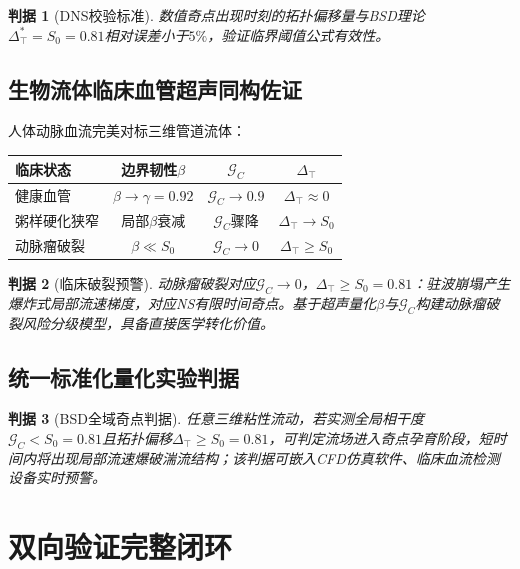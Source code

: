 \documentclass[11pt,a4paper]{ctexart}
\newtheorem{criterion}{判据}
\theoremstyle{remark}
\newcommand{\Szero}{S_{0}}
\newcommand{\GC}{\mathcal{G}_{\!C}}
\newcommand{\Dtop}{\Delta_{\!\top}}
\begin{document}
\begin{criterion}[DNS校验标准]\label{crit:dns}
数值奇点出现时刻的拓扑偏移量与BSD理论$\Dtop^{*}=\Szero=0.81$相对误差小于$5\%$，验证临界阈值公式有效性。
\end{criterion}

\subsection{生物流体临床血管超声同构佐证}\label{sec:vascular}

人体动脉血流完美对标三维管道流体：

\begin{center}
\begin{tabular}{lccc}
\toprule
临床状态 & 边界韧性$\beta$ & $\GC$ & $\Dtop$ \\
\midrule
健康血管         & $\beta\to\gamma=0.92$ & $\GC\to 0.9$ & $\Dtop\approx 0$ \\
粥样硬化狭窄     & 局部$\beta$衰减       & $\GC$骤降    & $\Dtop\to\Szero$ \\
动脉瘤破裂       & $\beta\ll\Szero$      & $\GC\to 0$   & $\Dtop\ge\Szero$ \\
\bottomrule
\end{tabular}
\end{center}

\begin{criterion}[临床破裂预警]\label{crit:clinical}
动脉瘤破裂对应$\GC\to 0$，$\Dtop\ge\Szero=0.81$：驻波崩塌产生爆炸式局部流速梯度，对应NS有限时间奇点。基于超声量化$\beta$与$\GC$构建动脉瘤破裂风险分级模型，具备直接医学转化价值。
\end{criterion}

\subsection{统一标准化量化实验判据}\label{sec:universal}

\begin{criterion}[BSD全域奇点判据]\label{crit:universal}
任意三维粘性流动，若实测全局相干度$\GC<\Szero=0.81$且拓扑偏移$\Dtop\ge\Szero=0.81$，可判定流场进入奇点孕育阶段，短时间内将出现局部流速爆破湍流结构；该判据可嵌入CFD仿真软件、临床血流检测设备实时预警。
\end{criterion}

\section{双向验证完整闭环}\label{sec:validation}
\end{document}
